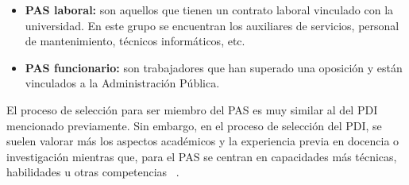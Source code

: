 \begin{itemize}
    \item \textbf{PAS laboral:} son aquellos que tienen un contrato laboral vinculado con la universidad. En este grupo se encuentran los auxiliares de servicios, personal de mantenimiento, técnicos informáticos, etc.
    \item \textbf{PAS funcionario:} son trabajadores que han superado una oposición y están vinculados a la Administración Pública.
\end{itemize}

El proceso de selección para ser miembro del PAS es muy similar al del PDI mencionado previamente. Sin embargo, en el proceso de selección del PDI, se suelen valorar más los aspectos académicos y la experiencia previa en docencia o investigación mientras que, para el PAS se centran en capacidades más técnicas, habilidades u otras competencias ~\cite{pas:latex}.